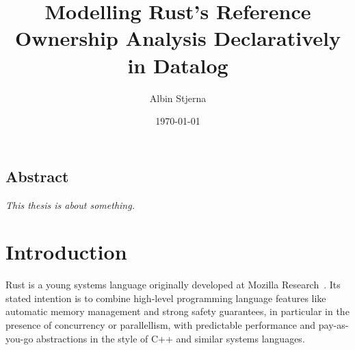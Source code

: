 \documentclass[11pt,a4paper,twoside,openany]{report}
\author{Albin Stjerna}
\date{\today}
\title{Modelling Rust's Reference Ownership Analysis Declaratively in Datalog}
\newcommand{\fixme}[1] {{\color{red}#1}}
\begin{document}


\maketitle

\section*{Abstract}
\textit{\fixme{This thesis is about something.}}


\begingroup
  \tableofcontents
\endgroup
  

\chapter{Introduction}

Rust is a young systems language originally developed at Mozilla
Research~\cite{matsakis_rust_2014}. Its stated intention is to combine
high-level programming language features like automatic memory management and
strong safety guarantees, in particular in the presence of concurrency or
parallellism, with predictable performance and pay-as-you-go abstractions in the
style of C++ and similar systems languages.
\end{document}
